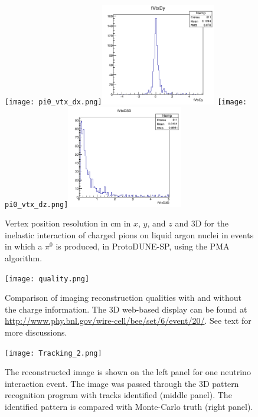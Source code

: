 \begin{figure}[htb]
\centering
\texttt{[image: pi0\_vtx\_dx.png]}\includegraphics[width=0.45\textwidth]{figures/pi0_vtx_dy.png}
\texttt{[image: pi0\_vtx\_dz.png]}\includegraphics[width=0.45\textwidth]{figures/pi0_vtx3d.png}
\caption{Vertex position resolution in cm in $x$, $y$, and $z$ and 3D for the
  inelastic interaction of charged pions on liquid argon nuclei in events in which a $\pi^0$ is produced, in
  ProtoDUNE-SP, using the PMA algorithm.}
\label{fig:PMApioninteraction}
\end{figure}




\begin{figure}
\centering
\texttt{[image: quality.png]}
\caption{\label{fig:quality} Comparison of imaging reconstruction 
qualities with and without the charge information. The 3D web-based 
display can be found at 
\protect\url{http://www.phy.bnl.gov/wire-cell/bee/set/6/event/20/}. 
See text for more discussions. }
\end{figure}


\begin{figure}
\centering
\texttt{[image: Tracking\_2.png]}
\caption{\label{fig:tracking2} The reconstructed image is shown 
on the left panel for one neutrino interaction event. The image 
was passed through the 3D pattern recognition program with tracks 
identified (middle panel). The identified pattern is compared 
with Monte-Carlo truth (right panel). }
\end{figure}

